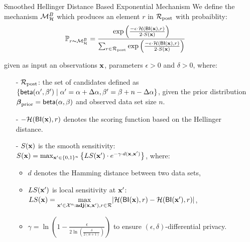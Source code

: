 \documentclass[final,hyperref={pdfpagelabels=false}]{beamer}
\begin{document}
\begin{frame}[t]
\begin{columns}[t]
\begin{column}{.485\textwidth}
\begin{block}{Smoothed Hellinger Distance Based Exponential Mechanism}
We define the mechanism $\mathcal{M}^{B}_{\mathcal{H}}$ which produces an element $r$ in $\mathcal{R}_{\textup{post}}$ with probaiblity:
\[
\mathbb{P}_{r \thicksim \mathcal{M}^{B}_{\mathcal{H}}} =
\frac 
{\exp \Big(\frac{-\epsilon\cdot\mathcal{H}(\mathsf{BI}(\textbf{x}),r)}{2\cdot S(\textbf{x})}\Big)}
{\sum_{r\in\mathcal{R}_{\textup{post}}} \exp \Big(\frac{-\epsilon\cdot\mathcal{H}(\mathsf{BI}(\textbf{x}),r)}{2\cdot S(\textbf{x})}\Big)}
\]

given as input an observations $\textbf{x}$, parameters $\epsilon>0$ and $\delta>0$, where:

\begin{itemize}
  \item[-] $\mathcal{R}_{\textup{post}}$: the set of candidates defined as $\{\mathsf{beta}(\alpha',\beta')\mid \alpha'=\alpha+\Delta\alpha, \beta'=\beta+n-\Delta\alpha\}$, given the prior distribution $\boldsymbol{\beta}_{\textup{prior}}=\mathsf{beta}(\alpha, \beta)$ and observed data set size $n$.

  \item[-] $-\mathcal{H}(\mathsf{BI}(\textbf{x}),r)$ denotes the scoring function based on the Hellinger distance.

  \item[-] $S(\textbf{x})$ is the smooth sensitivity\cite{nissim2007smooth}:
  $
  S(\textbf{x})=\max_{\textbf{x}' \in \{0,1\}^{n}}\big\{ LS(\textbf{x}') \cdot e^{-\gamma\cdot d(\textbf{x},\textbf{x}')}\big\}
  $,
  where:
  \begin{itemize}
   \item $d$ denotes the Hamming distance between two data sets,

   \item $LS(\textbf{x}')$ is local sensitivity at $\textbf{x}'$:
   $
   LS(\textbf{x})=\max\limits_{\textbf{x}' \in \mathcal{X}^n:\textbf{adj}(\textbf{x},\textbf{x}'), r\in \mathcal{R}}\lvert \mathcal{H}(\mathsf{BI}(\textbf{x}), r) - \mathcal{H}(\mathsf{BI}(\textbf{x}'), r)\rvert
   $,

   \item $\gamma =   \ln(1 - \frac{\epsilon}{2 \ln (\frac{\delta}{2 (n + 1)})})$ to ensure $(\epsilon,\delta)$-differential privacy.
 \end{itemize}
\end{itemize}


\end{block}


\end{column} %

\begin{column}{.01\textwidth}\end{column} %
 

\end{columns}
\end{frame}
\end{document}
